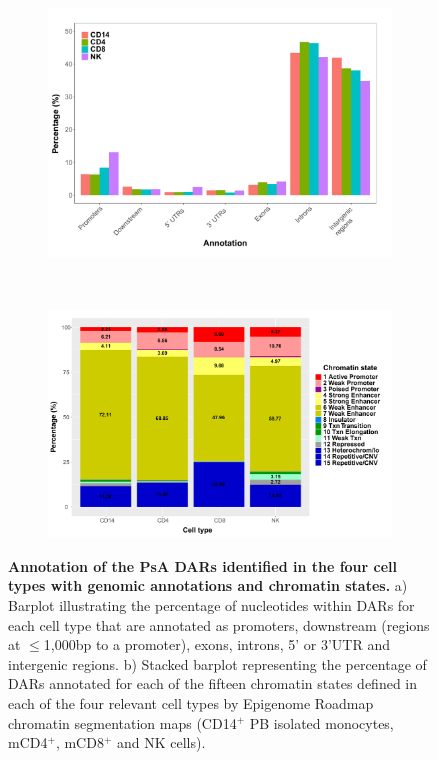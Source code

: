 \bigskip
\begin{figure}[H]
\centering
\begin{subfigure}[b]{0.5\textwidth}
\centering 
\includegraphics[width=\textwidth]{./Results3/pdfs/ATAC_PSA_DOCS_per_cell_type_general_annotation}
\caption{}
\end{subfigure}
~
\begin{subfigure}[b]{0.6\textwidth} 
\centering
\includegraphics[width=\textwidth]{./Results3/pdfs/ATAC_PSA_DOCS_chromatin_states_stacked_barplot}
\caption{}
\end{subfigure}
\caption[Annotation of the PsA DARs identified in the four cell types with genomic annotations and chromatin states.]{\textbf{Annotation of the PsA DARs identified in the four cell types with genomic annotations and chromatin states.} a) Barplot illustrating the percentage of nucleotides within DARs for each cell type that are annotated as promoters, downstream (regions at $\leq$1,000bp to a promoter), exons, introns, 5' or 3'UTR and intergenic regions. b) Stacked barplot representing the percentage of DARs annotated for each of the fifteen chromatin states defined in each of the four relevant cell types by Epigenome Roadmap chromatin segmentation maps (CD14$^+$ PB isolated monocytes, mCD4$^+$, mCD8$^+$ and NK cells).}
\label{figure:PsA_FAST_ATAC_DOCS_annotation}
\end{figure}


